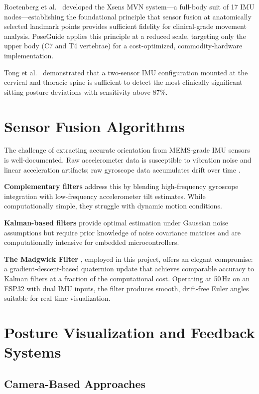 \documentclass[12pt,a4paper]{report}
\begin{document}
Roetenberg et al.\ \cite{roetenberg2009} developed the Xsens MVN system—a full-body suit of 17 IMU nodes—establishing the foundational principle that sensor fusion at anatomically selected landmark points provides sufficient fidelity for clinical-grade movement analysis. PoseGuide applies this principle at a reduced scale, targeting only the upper body (C7 and T4 vertebrae) for a cost-optimized, commodity-hardware implementation.

Tong et al.\ \cite{tong2015} demonstrated that a two-sensor IMU configuration mounted at the cervical and thoracic spine is sufficient to detect the most clinically significant sitting posture deviations with sensitivity above 87\%.

\section{Sensor Fusion Algorithms}

The challenge of extracting accurate orientation from MEMS-grade IMU sensors is well-documented. Raw accelerometer data is susceptible to vibration noise and linear acceleration artifacts; raw gyroscope data accumulates drift over time \cite{madgwick2010}.

\textbf{Complementary filters} \cite{mahony2008} address this by blending high-frequency gyroscope integration with low-frequency accelerometer tilt estimates. While computationally simple, they struggle with dynamic motion conditions.

\textbf{Kalman-based filters} \cite{sabatini2006} provide optimal estimation under Gaussian noise assumptions but require prior knowledge of noise covariance matrices and are computationally intensive for embedded microcontrollers.

\textbf{The Madgwick Filter} \cite{madgwick2010}, employed in this project, offers an elegant compromise: a gradient-descent-based quaternion update that achieves comparable accuracy to Kalman filters at a fraction of the computational cost. Operating at 50\,Hz on an ESP32 with dual IMU inputs, the filter produces smooth, drift-free Euler angles suitable for real-time visualization.

\section{Posture Visualization and Feedback Systems}

\subsection{Camera-Based Approaches}
\end{document}
